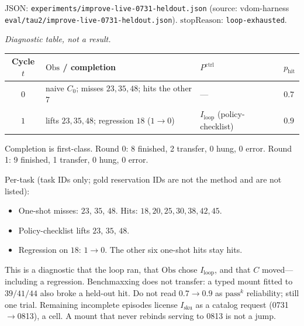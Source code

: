 \documentclass{article}
\begin{document}
JSON: \texttt{experiments/improve-live-0731-heldout.json} (source: vdom-harness \texttt{eval/tau2/improve-live-0731-heldout.json}). \(\mathrm{stopReason}\): \texttt{loop-exhausted}.

\begin{center}
\small
\textit{Diagnostic table, not a result.}\\[0.4em]
\begin{tabular}{clll}
\toprule
Cycle \(t\) & \(\mathrm{Obs}\) / completion & \(P^{\mathrm{ctrl}}\) & \(p_{\mathrm{hit}}\) \\
\midrule
\(0\) & naive \(C_0\); misses \(23,35,48\); hits the other 7 & --- & \(0.7\) \\
\(1\) & lifts \(23,35,48\); regression \(18\) (\(1\to 0\)) & \(I_{\mathrm{loop}}\) (policy-checklist) & \(0.9\) \\
\bottomrule
\end{tabular}
\end{center}

Completion is first-class. Round 0: 8 finished, 2 transfer, 0 hung, 0 error. Round 1: 9 finished, 1 transfer, 0 hung, 0 error.

Per-task (task IDs only; gold reservation IDs are not the method and are not listed):
\begin{itemize}
\item One-shot misses: \(23\), \(35\), \(48\). Hits: \(18,20,25,30,38,42,45\).
\item Policy-checklist lifts \(23\), \(35\), \(48\).
\item Regression on \(18\): \(1\to 0\). The other six one-shot hits stay hits.
\end{itemize}

This is a diagnostic that the loop ran, that \(\mathrm{Obs}\) chose \(I_{\mathrm{loop}}\), and that \(C\) moved---including a regression. Benchmaxxing does not transfer: a typed mount fitted to \(39/41/44\) also broke a held-out hit. Do not read \(0.7\to 0.9\) as \(\mathrm{pass}^k\) reliability; still one trial. Remaining incomplete episodes license \(I_{\mathrm{sku}}\) as a catalog request (0731\(\to\)0813), a cell. A mount that never rebinds serving to 0813 is not a jump.
\end{document}
